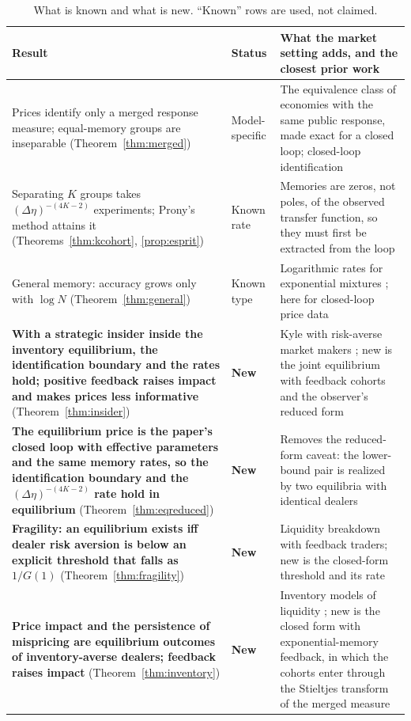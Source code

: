 \documentclass[12pt]{article}
\theoremstyle{definition}
\theoremstyle{remark}
\begin{document}
\begin{table}[!t]\centering\small
\caption{What is known and what is new. ``Known'' rows are used, not claimed.}\label{tab:whatnew}
\begin{tabularx}{\textwidth}{>{\raggedright\arraybackslash}p{}>{\raggedright\arraybackslash}p{}X}
\toprule
Result & Status & What the market setting adds, and the closest prior work\\
\midrule
Prices identify only a merged response measure; equal-memory groups are inseparable (Theorem~\ref{thm:merged}) & Model-specific & The equivalence class of economies with the same public response, made exact for a closed loop; closed-loop identification \citep{ljung1999,forssell1999}\\
Separating $K$ groups takes $(\Delta\eta)^{-(4K-2)}$ experiments; Prony's method attains it (Theorems~\ref{thm:kcohort}, \ref{prop:esprit}) & Known rate & Memories are zeros, not poles, of the observed transfer function, so they must first be extracted from the loop \citep{heinrich2018,wu2020,katz2023}\\
General memory: accuracy grows only with $\log N$ (Theorem~\ref{thm:general}) & Known type & Logarithmic rates for exponential mixtures \citep{rebafka2015}; here for closed-loop price data\\
\textbf{With a strategic insider inside the inventory equilibrium, the identification boundary and the rates hold; positive feedback raises impact and makes prices less informative} (Theorem~\ref{thm:insider}) & \textbf{New} & Kyle with risk-averse market makers \citep{kyle1985}; new is the joint equilibrium with feedback cohorts and the observer's reduced form\\
\textbf{The equilibrium price is the paper's closed loop with effective parameters and the same memory rates, so the identification boundary and the $(\Delta\eta)^{-(4K-2)}$ rate hold in equilibrium} (Theorem~\ref{thm:eqreduced}) & \textbf{New} & Removes the reduced-form caveat: the lower-bound pair is realized by two equilibria with identical dealers\\
\textbf{Fragility: an equilibrium exists iff dealer risk aversion is below an explicit threshold that falls as $1/G(1)$} (Theorem~\ref{thm:fragility}) & \textbf{New} & Liquidity breakdown with feedback traders; new is the closed-form threshold and its rate\\
\textbf{Price impact and the persistence of mispricing are equilibrium outcomes of inventory-averse dealers; feedback raises impact } (Theorem~\ref{thm:inventory}) & \textbf{New} & Inventory models of liquidity \citep{grossman1988,hostoll1981}; new is the closed form with exponential-memory feedback, in which the cohorts enter through the Stieltjes transform of the merged measure\\

\end{tabularx}
\end{table}
\end{document}
